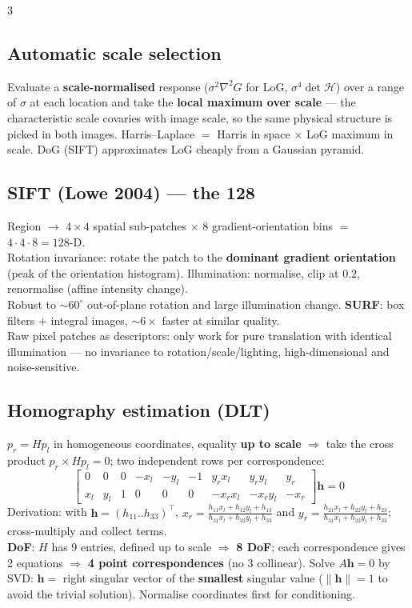 \documentclass[9pt,a4paper,landscape]{extarticle}
\newcommand{\key}[1]{\textbf{#1}}
\begin{document}
\begin{multicols}{3}
\subsection{Automatic scale selection}
Evaluate a \key{scale-normalised} response ($\sigma^2\nabla^2G$ for LoG, $\sigma^4\det\mathcal H$) over a range of $\sigma$ at each location and take the \key{local maximum over scale} --- the characteristic scale covaries with image scale, so the same physical structure is picked in both images. Harris--Laplace $=$ Harris in space $\times$ LoG maximum in scale. DoG (SIFT) approximates LoG cheaply from a Gaussian pyramid.

\subsection{SIFT (Lowe 2004) --- the 128}
Region $\to$ $4\times4$ spatial sub-patches $\times$ $8$ gradient-orientation bins $=$ \key{$4\cdot4\cdot8=128$}-D.\\
Rotation invariance: rotate the patch to the \key{dominant gradient orientation} (peak of the orientation histogram). Illumination: normalise, clip at $0.2$, renormalise (affine intensity change).\\
Robust to $\sim60^\circ$ out-of-plane rotation and large illumination change. \key{SURF}: box filters $+$ integral images, $\sim6\times$ faster at similar quality.\\
Raw pixel patches as descriptors: only work for pure translation with identical illumination --- no invariance to rotation/scale/lighting, high-dimensional and noise-sensitive.

\subsection{Homography estimation (DLT)}
$p_r=Hp_l$ in homogeneous coordinates, equality \key{up to scale} $\Rightarrow$ take the cross product $p_r\times Hp_l=0$; two independent rows per correspondence:
$$\begin{bmatrix}0&0&0&-x_l&-y_l&-1&y_rx_l&y_ry_l&y_r\\ x_l&y_l&1&0&0&0&-x_rx_l&-x_ry_l&-x_r\end{bmatrix}\mathbf h=0$$
Derivation: with $\mathbf h=(h_{11}..h_{33})^\top$, $x_r=\frac{h_{11}x_l+h_{12}y_l+h_{13}}{h_{31}x_l+h_{32}y_l+h_{33}}$ and $y_r=\frac{h_{21}x_l+h_{22}y_l+h_{23}}{h_{31}x_l+h_{32}y_l+h_{33}}$; cross-multiply and collect terms.\\
\key{DoF}: $H$ has 9 entries, defined up to scale $\Rightarrow$ \key{8 DoF}; each correspondence gives 2 equations $\Rightarrow$ \key{4 point correspondences} (no 3 collinear). Solve $A\mathbf h=0$ by SVD: $\mathbf h=$ right singular vector of the \key{smallest} singular value ($\|\mathbf h\|=1$ to avoid the trivial solution). Normalise coordinates first for conditioning.


\end{multicols}
\end{document}
